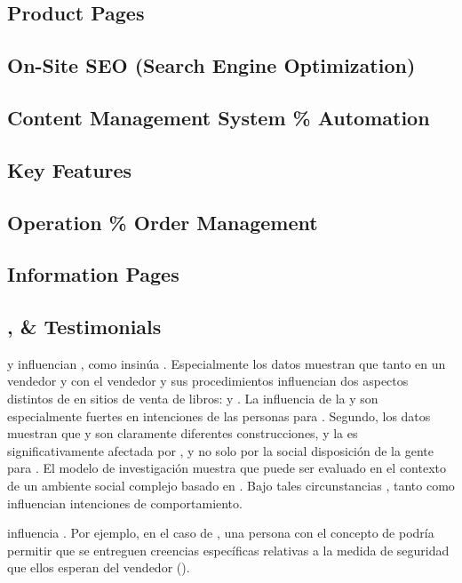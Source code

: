 \subsection{Product Pages}
\subsection{On-Site SEO (Search Engine Optimization)}
\subsection{Content Management System \% Automation}
\subsection{Key \ecommerce Features}
\subsection{Operation \% Order Management}
\subsection{Information Pages}
\subsection{\security, \trust \& Testimonials}

\trust y \familiarity influencian \ecommerce, como insinúa \luhmanntheory. Especialmente los datos muestran que tanto \trust en un vendedor \internet y \familiarity con el vendedor y sus procedimientos influencian dos aspectos distintos de \ecommerce en sitios de venta de libros: \inquiry y \purchase. La influencia de la  \familiarity y \trust son especialmente fuertes en intenciones  de las personas para \purchase. Segundo, los datos muestran que \trust y \familiarity son claramente diferentes construcciones, y la \trust es significativamente afectada por \familiarity, y no solo por la social disposición de la gente para \trust. El modelo de investigación muestra que  \ecommerce puede ser evaluado en el contexto de un ambiente social complejo basado en \luhmanntheory. Bajo tales circunstancias , tanto \trust como \familiarity influencian intenciones de comportamiento\cite{gefen2000commerce}.

\security influencia \trust. Por ejemplo, en el caso de \amazon, una persona \familiarity con el concepto de \secureintcom podría permitir que se entreguen creencias específicas relativas a la medida de seguridad que ellos esperan del vendedor (\trust)\cite{gefen2000commerce}.

